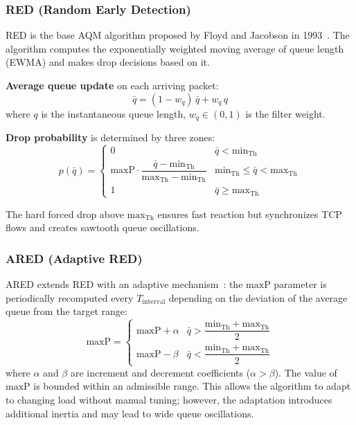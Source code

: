 \documentclass[default]{subfiles}
\begin{document}
{\subsubsection{RED (Random Early Detection)}

RED is the base AQM algorithm proposed by Floyd and Jacobson in 1993~\cite{floyd1993}. The algorithm computes the exponentially weighted moving average of queue length (EWMA) and makes drop decisions based on it.

\textbf{Average queue update} on each arriving packet:
\begin{equation}
\bar{q} = (1 - w_q)\,\bar{q} + w_q\,q
\end{equation}
where $q$ is the instantaneous queue length, $w_q \in (0,1)$ is the filter weight.

\textbf{Drop probability} is determined by three zones:
\begin{equation}
p(\bar{q}) = \begin{cases}
0 & \bar{q} < \mathrm{min}_{\mathrm{Th}} \\
\mathrm{maxP} \cdot \dfrac{\bar{q} - \mathrm{min}_{\mathrm{Th}}}{\mathrm{max}_{\mathrm{Th}} - \mathrm{min}_{\mathrm{Th}}} & \mathrm{min}_{\mathrm{Th}} \le \bar{q} < \mathrm{max}_{\mathrm{Th}} \\
1 & \bar{q} \ge \mathrm{max}_{\mathrm{Th}}
\end{cases}
\end{equation}

The hard forced drop above $\mathrm{max}_{\mathrm{Th}}$ ensures fast reaction but synchronizes TCP flows and creates sawtooth queue oscillations.

\subsubsection{ARED (Adaptive RED)}

ARED extends RED with an adaptive mechanism~\cite{floyd2001}: the $\mathrm{maxP}$ parameter is periodically recomputed every $T_{\mathrm{interval}}$ depending on the deviation of the average queue from the target range:
\begin{equation}
\mathrm{maxP} = \begin{cases}
\mathrm{maxP} + \alpha & \bar{q} > \dfrac{\mathrm{min}_{\mathrm{Th}} + \mathrm{max}_{\mathrm{Th}}}{2} \\[6pt]
\mathrm{maxP} - \beta & \bar{q} < \dfrac{\mathrm{min}_{\mathrm{Th}} + \mathrm{max}_{\mathrm{Th}}}{2}
\end{cases}
\end{equation}
where $\alpha$ and $\beta$ are increment and decrement coefficients ($\alpha > \beta$). The value of $\mathrm{maxP}$ is bounded within an admissible range. This allows the algorithm to adapt to changing load without manual tuning; however, the adaptation introduces additional inertia and may lead to wide queue oscillations.

}
\end{document}
